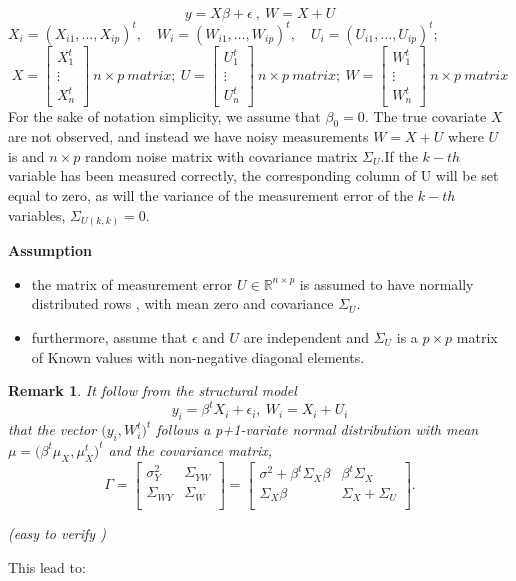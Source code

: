 \documentclass[12pt]{report}
\newtheorem{remarque}{Remark}[section]
\begin{document}
\begin{equation}
	y=X\beta + \epsilon\ ,\ W=X+U
	\label{f46}
\end{equation}
$X_{i}=(X_{i1},\dots,X_{ip})^{t},\quad W_{i}=(W_{i1},\dots,W_{ip})^{t},\quad U_{i}=(U_{i1},\dots,U_{ip})^{t};$
$$ X=
\begin{bmatrix}
	X_{1}^{t} \\
	\vdots \\
	X_{n}^{t}
\end{bmatrix}\ n\times p\ matrix;\  U=
\begin{bmatrix}
U_{1}^{t} \\
\vdots \\
U_{n}^{t}
\end{bmatrix}\ n\times p\ matrix;\  W=
\begin{bmatrix}
W_{1}^{t} \\
\vdots \\
W_{n}^{t}
\end{bmatrix}\ n\times p\ matrix$$
For the sake of notation simplicity, we assume that $\beta_{0}=0$. The true covariate $X$ are not observed, and instead we have noisy measurements $W=X+U$ where $U$ is and $n\times p$ random noise matrix with covariance matrix $\Sigma_{U}$.If the $k-th$ variable has been measured correctly, the corresponding column of U will be set equal to zero, as will the variance of the measurement error of the $k-th$ variables, $\Sigma_{U(k,k)}=0$.

\textbf{Assumption}
\begin{itemize}
	\item the matrix of measurement error $U \in \mathbb{R}^{n\times p}$ is assumed to have normally distributed rows , with mean zero and covariance $\Sigma_{U}$. 
	\item furthermore, assume that $\epsilon$ and $U$ are independent and  $\Sigma_{U}$ is a $p\times p$ matrix of Known values with non-negative diagonal elements.
\end{itemize}
\begin{remarque}
	It follow from the structural model
	\begin{equation}
		y_{i}=\beta^{t}X_{i}+\epsilon_{i},\ W_{i}=X_{i}+U_{i}
		\label{f47}
	\end{equation} that the vector $\big(y_{i},W_{i}^{t}\big)^{t}$ follows a p+1-variate normal distribution with mean $\mu= \big(\beta^{t}\mu_{X},\mu_{X}^{t}\big)^{t}$ and the covariance matrix,
\begin{equation}
	\Gamma=\begin{bmatrix}
		\sigma^{2}_{Y}& \Sigma_{YW} \\
		\Sigma_{WY} &\Sigma_{W} \\
	\end{bmatrix} =\begin{bmatrix}
		\sigma^{2}+\beta^{t}\Sigma_{X}\beta& \beta^{t}\Sigma_{X} \\
		\Sigma_{X}\beta &\Sigma_{X}+ \Sigma_{U}\\
	\end{bmatrix}.
\label{f48}
\end{equation}

(easy to verify ) 
\end{remarque}
This lead to:
\end{document}
